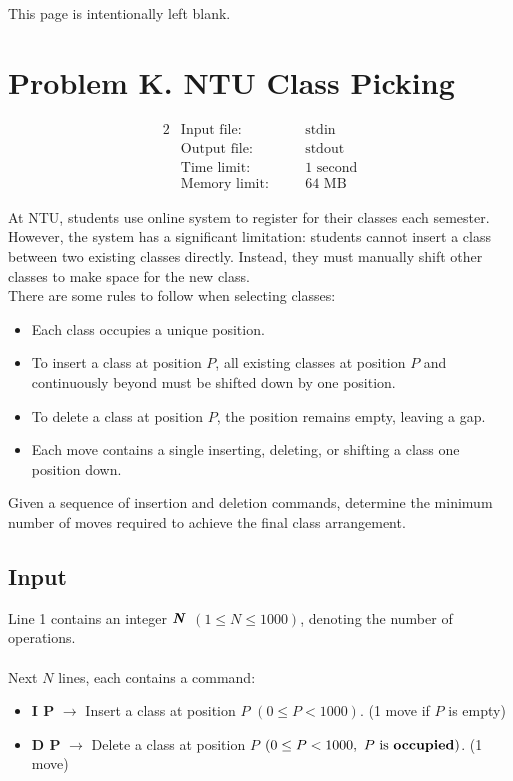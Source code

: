 \documentclass[12pt,a4paper]{article}
\newcommand*{\blankpage}{%
\newpage
\vspace*{\fill}
{\centering \huge This page is intentionally left blank.\par}
\vspace{\fill}
\newpage}
\begin{document}
\blankpage

\section*{\fontsize{18}{12}Problem K. NTU Class Picking}

\begin{alignat*} {2}
 &   \text{Input file:}   \quad     &&\text{stdin}\\
 &   \text{Output file:}  \quad     &&\text{stdout}\\
 &   \text{Time limit:}   \quad     &&\text{1 second}\\
 &   \text{Memory limit:} \quad     &&\text{64 MB}
\end{alignat*}

\noindent
At NTU, students use online system to register for their classes each semester. However, the system has a significant limitation: students cannot insert a class between two existing classes directly. Instead, they must manually shift other classes to make space for the new class.
\\
\noindent
There are some rules to follow when selecting classes:
\begin{itemize}
    \item Each class occupies a unique position.
    \item To insert a class at position \textbf{\( P \)}, all existing classes at position \textbf{\( P \)} and continuously beyond must be shifted down by one position.
    \item To delete a class at position \textbf{\( P \)}, the position remains empty, leaving a gap.
    \item Each move contains a single inserting, deleting, or shifting a class one position down.
\end{itemize}

\noindent
Given a sequence of insertion and deletion commands, determine the minimum number of moves required to achieve the final class arrangement.

\subsection*{\fontsize{16}{12}Input}
Line 1 contains an integer \(\textbf{\textit{N}}\) \((1 \leq N \leq 1000)\), denoting the number of operations.
\\\\
\noindent
Next \textbf{\( N \)} lines, each contains a command:
    \begin{itemize}
        \item \textbf{I P} $\rightarrow$ Insert a class at position \( P \) \((0 \leq P < 1000)\). (1 move if $P$ is empty)
        \item \textbf{D P} $\rightarrow$ Delete a class at position \( P \) \((0 \leq P < 1000,\ P\text{ is \textbf{occupied}})\). (1 move)
    \end{itemize}
\end{document}

